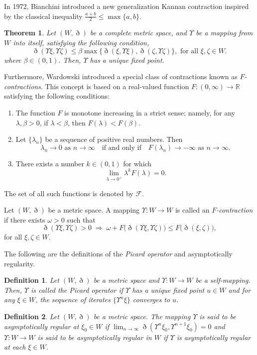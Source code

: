 \documentclass[pdflatex,sn-mathphys-num]{sn-jnl}%
\theoremstyle{thmstyleone}%
\newtheorem{theorem}{Theorem}%
\theoremstyle{thmstyletwo}%
\theoremstyle{thmstylethree}%
\newtheorem{definition}{Definition}%
\begin{document}
In 1972, Bianchini \cite{bianchini} introduced a new generalization Kannan contraction inspired by the classical inequality $\frac{a+b}{2} \le \max \{a,b\}$.
\begin{theorem}\cite{bianchini}
    Let $(W, \eth)$ be a complete metric space, and $\Upsilon $ be a  mapping from $W$ into itself, satisfying the following condition,
\begin{equation}
\eth(\Upsilon \xi, \Upsilon \zeta) \leq \beta \max\{\eth(\xi,\Upsilon \xi ),\eth(\zeta ,\Upsilon \zeta)\}, \text{ for all }  \xi,\zeta \in W.
\end{equation}
where $\beta \in (0,1)$.
Then, $\Upsilon $ has a unique fixed point.	
\end{theorem}


Furthermore, Wardowski \cite{wardowski} introduced a special class of contractions known as \emph{$F$-contractions}. 
This concept is based on a real-valued function $F : (0,\infty) \to \mathbb{R}$ satisfying the following conditions:
\begin{enumerate}
    \item[(W1)] The function $F$ is monotone increasing in a strict sense; namely, for any $\lambda,\beta>0$, if $\lambda<\beta$, then $F(\lambda)<F(\beta)$.

    \item[(W2)] Let $\{\lambda_n\}$ be a sequence of positive real numbers. Then
    \[
    \lambda_n \to 0 \text{ as } n\to\infty 
    \quad \text{if and only if} \quad
    F(\lambda_n) \to -\infty \text{ as } n\to\infty.
    \]

    \item[(W3)] There exists a number $k\in(0,1)$ for which
    \[
    \lim_{\lambda\to 0^{+}} \lambda^{k}F(\lambda)=0.
    \]
\end{enumerate}

The set of all such functions is denoted by $\mathcal{F}$.

Let $(W,\eth)$ be a metric space. A mapping $\Upsilon  : W \to W$ is called an 
\emph{$F$-contraction} if there exists $\omega   > 0$ such that
\[
\eth(\Upsilon \xi,\Upsilon \zeta) > 0
\;\Rightarrow\;
\omega   + F\big(\eth(\Upsilon \xi,\Upsilon \zeta)\big) \le F\big(\eth(\xi,\zeta)\big),
\]
for all $\xi,\zeta \in W$. 


The following are the definitions of the \textit{Picard operator} and asymptotically regularity.
\begin{definition}\cite{picard}
Let $(W,\eth)$ be a metric space and $\Upsilon : W\to W$ be a self-mapping. Then, $\Upsilon $ is called the \textit{Picard operator} if $\Upsilon $ has a unique fixed point $u \in W$ and for any $\xi \in W$, the sequence of iterates $\{\Upsilon^n\xi\}$ converges to $u$.	
\end{definition}
\begin{definition} \cite{asym}
Let $(W,\eth)$ be a metric space. The mapping
$\Upsilon $ is said to be asymptotically regular at $\xi_0 \in W$ if
$\lim_{n \to \infty} \eth(\Upsilon^n{\xi_0}, \Upsilon^{n+1}{\xi_0}) = 0$
and  $\Upsilon :W\rightarrow W$ is said to be asymptotically regular  in $W$ if $\Upsilon $ is asymptotically regular at each $\xi \in W$.
\end{definition}
\end{document}
